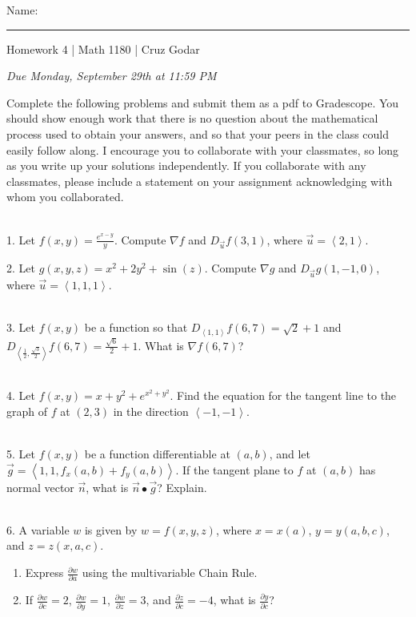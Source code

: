 \documentclass{article}
\begin{document}
\Large Name: \rule{2in}{0.15mm} \hfill Homework 4 | Math 1180 | Cruz Godar \vspace{4pt}  \normalsize

\textit{Due Monday, September 29th at 11:59 PM}

Complete the following problems and submit them as a pdf to Gradescope. You should show enough work that there is no question about the mathematical process used to obtain your answers, and so that your peers in the class could easily follow along. I encourage you to collaborate with your classmates, so long as you write up your solutions independently. If you collaborate with any classmates, please include a statement on your assignment acknowledging with whom you collaborated.

~\\

1. Let $f(x, y) = \frac{e^{x - y}}{y}$. Compute $\nabla\! f$ and $D_{\vec{u}}f(3, 1)$, where $\vec{u} = \left< 2, 1 \right>$.

2. Let $g(x, y, z) = x^2 + 2y^2 + \sin(z)$. Compute $\nabla\! g$ and $D_{\vec{u}}g(1, -1, 0)$, where $\vec{u} = \left< 1, 1, 1 \right>$.

~\\

3. Let $f(x, y)$ be a function so that $D_{\left< 1, 1 \right>}f(6, 7) = \sqrt{2} + 1$ and $D_{\left< \frac{1}{2}, \frac{\sqrt{3}}{2} \right>}f(6, 7) = \frac{\sqrt{6}}{2} + 1$. What is $\nabla\! f (6, 7)$?

~\\

4. Let $f(x, y) = x + y^2 + e^{x^2 + y^2}$. Find the equation for the tangent line to the graph of $f$ at $(2, 3)$ in the direction $\left< -1, -1 \right>$.

~\\

5. Let $f(x, y)$ be a function differentiable at $(a, b)$, and let $\vec{g} = \left< 1, 1, f_x(a, b) + f_y(a, b) \right>$. If the tangent plane to $f$ at $(a, b)$ has normal vector $\vec{n}$, what is $\vec{n} \bullet \vec{g}$? Explain.

~\\

6. A variable $w$ is given by $w = f(x, y, z)$, where $x = x(a)$, $y = y(a, b, c)$, and $z = z(x, a, c)$.

\begin{enumerate}

	\item Express $\frac{\partial w}{\partial a}$ using the multivariable Chain Rule.

	\item If $\frac{\partial w}{\partial c} = 2$, $\frac{\partial w}{\partial y} = 1$, $\frac{\partial w}{\partial z} = 3$, and $\frac{\partial z}{\partial c} = -4$, what is $\frac{\partial y}{\partial c}$?

\end{enumerate}
\end{document}

